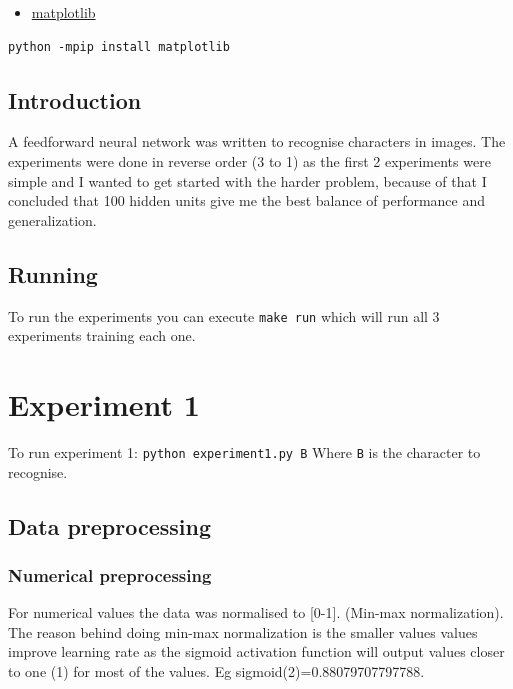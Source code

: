 \documentclass[11pt]{article}
\providecommand{\tightlist}{%
      \setlength{\itemsep}{0pt}\setlength{\parskip}{0pt}}
\begin{document}
\begin{itemize}
\tightlist
\item
  \href{https://matplotlib.org/}{matplotlib}
\end{itemize}

\begin{verbatim}
python -mpip install matplotlib
\end{verbatim}

\hypertarget{introduction}{%
\subsection{Introduction}\label{introduction}}

A feedforward neural network was written to recognise characters in
images. The experiments were done in reverse order (3 to 1) as the first
2 experiments were simple and I wanted to get started with the harder
problem, because of that I concluded that 100 hidden units give me the
best balance of performance and generalization.

\hypertarget{running}{%
\subsection{Running}\label{running}}

To run the experiments you can execute \texttt{make\ run} which will run
all 3 experiments training each one.

    \hypertarget{experiment-1}{%
\section{Experiment 1}\label{experiment-1}}

To run experiment 1: \texttt{python\ experiment1.py\ B} Where \texttt{B}
is the character to recognise.

\hypertarget{data-preprocessing}{%
\subsection{Data preprocessing}\label{data-preprocessing}}

\hypertarget{numerical-preprocessing}{%
\subsubsection{Numerical preprocessing}\label{numerical-preprocessing}}

For numerical values the data was normalised to {[}0-1{]}. (Min-max
normalization). The reason behind doing min-max normalization is the
smaller values values improve learning rate as the sigmoid activation
function will output values closer to one (1) for most of the values. Eg
sigmoid(2)=0.88079707797788.
\end{document}
